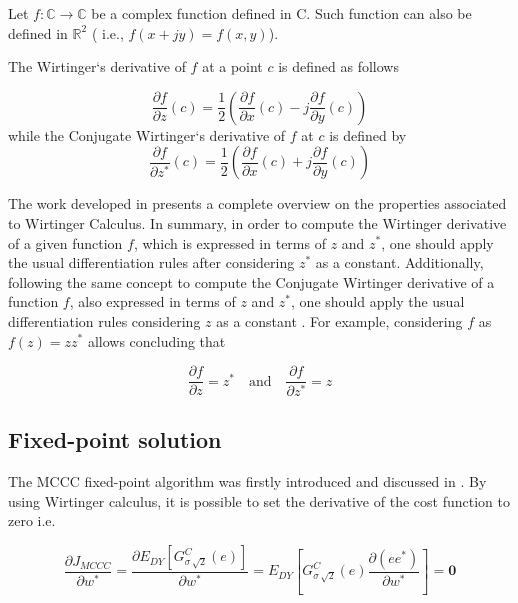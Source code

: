 \documentclass[preprint,12pt]{elsarticle}
\begin{document}
Let $f : \mathbb{C} \rightarrow \mathbb{C}$ be a complex function defined in C. Such function can also be defined in $\mathbb{R}^{2}$ ( i.e., $f(x + jy) = f(x,y)$).


The Wirtinger`s derivative of $f$ at a point $c$ is defined as follows \citep{Bouboulis2011ExtensionLMS}

\begin{equation}\label{eq1}
\frac{\partial f}{\partial z} (c) = \frac{1}{2} \left ( \frac{\partial f}{\partial x}(c) - j\frac{\partial f}{\partial y}(c) \right )
\end{equation}
while the Conjugate Wirtinger`s derivative of $f$ at $c$ is defined by
\begin{equation}\label{eq2}
\frac{\partial f}{\partial z^{*}} (c) = \frac{1}{2} \left ( \frac{\partial f}{\partial x}(c) + j\frac{\partial f}{\partial y}(c) \right )
\end{equation}


The work developed in \citep{Bouboulis2011ExtensionLMS} presents a complete overview on the properties associated to Wirtinger Calculus. In summary, in order to compute the Wirtinger derivative of a given function $f$, which is expressed in terms of $z$ and $z^{*}$, one should apply the usual differentiation rules after considering $z^{*}$ as a constant. Additionally, following the same concept to compute the Conjugate Wirtinger derivative of a function $f$, also expressed in terms of $z$ and $z^{*}$, one should apply the usual differentiation rules considering $z$ as a constant \citep{Bouboulis2011ExtensionLMS}. For example, considering $f$ as $f(z) = zz^{*}$ allows concluding that

\begin{equation}
\frac{\partial f}{\partial z} = z ^{*} \quad \text{and} \quad \frac{\partial f}{\partial z^{*}} = z
\end{equation}


\subsection{Fixed-point solution}

The MCCC fixed-point algorithm was firstly introduced and discussed in \citep{7763864}. By using Wirtinger calculus, it is possible to set the derivative of the cost function to zero i.e.

\begin{equation}\label{primeira}
\frac{\partial J_{MCCC} }{\partial w^{*}} = \frac{\partial E_{DY}[G^{C}_{\sigma\,\sqrt{2}}(e)] }{\partial w^{*}}  = E_{DY} \left [ G^{C}_{\sigma\,\sqrt{2}}(e)\frac{\partial (ee^*) }{\partial w^{*}} \right ]   =  \textbf{0}
\end{equation}
\end{document}
